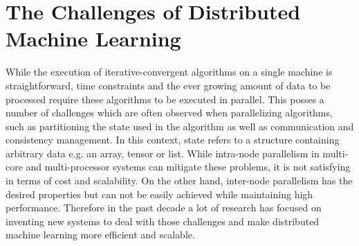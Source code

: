\section{The Challenges of Distributed Machine Learning}
\label{s:distributed_ml}
While the execution of iterative-convergent algorithms on a single machine is straightforward, time constraints and the ever growing amount of data to be processed require these algorithms to be executed in parallel.
This posses a number of challenges which are often observed when parallelizing algorithms, such as partitioning the state used in the algorithm as well as communication and consistency management.
In this context, state refers to a structure containing arbitrary data e.g. an array, tensor or list.
While intra-node parallelism in multi-core and multi-processor systems can mitigate these problems, it is not satisfying in terms of cost and scalability.
On the other hand, inter-node parallelism has the desired properties but can not be easily achieved while maintaining high performance.
Therefore in the past decade a lot of research has focused on inventing new systems to deal with those challenges and make distributed machine learning more efficient and scalable.

